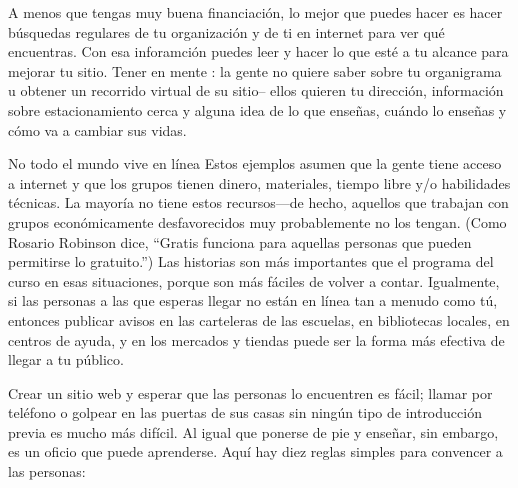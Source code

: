 A menos que tengas muy buena financiación,
lo mejor que puedes hacer es hacer búsquedas regulares de tu organización y de ti en internet 
para ver qué encuentras.
Con esa inforamción puedes leer 
y hacer lo que esté a tu alcance para mejorar tu sitio.
Tener en mente :
la gente no quiere saber sobre tu organigrama u obtener un recorrido virtual de su sitio-- ellos quieren tu dirección,
información sobre estacionamiento cerca 
y alguna idea de lo que enseñas,
cuándo lo enseñas
y cómo va a cambiar sus vidas.


\begin{aside}{No todo el mundo vive en línea}
Estos ejemplos asumen que la gente tiene acceso a internet y que los grupos 
tienen dinero, materiales, tiempo libre y/o habilidades técnicas.
La mayoría no tiene estos recursos---de hecho,
aquellos que trabajan con grupos económicamente desfavorecidos muy probablemente no los tengan.
(Como Rosario Robinson dice, ``Gratis funciona para aquellas personas que pueden permitirse lo gratuito.'')
Las historias son más importantes que el programa del curso en esas situaciones,
porque son más fáciles de volver a contar.
Igualmente,
si las personas a las que esperas llegar no están en línea tan a menudo como tú,
entonces publicar avisos en las carteleras de las escuelas,
en bibliotecas locales,
en centros de ayuda,
y en los mercados y tiendas puede ser la forma más efectiva de llegar a tu público.
\end{aside}



Crear un sitio web y esperar que las personas lo encuentren es fácil;
llamar por teléfono o golpear en las puertas de sus casas sin ningún tipo de introducción previa es mucho más difícil.
Al igual que ponerse de pie y enseñar,
sin embargo, es un oficio que puede aprenderse.
 Aquí hay diez reglas simples para convencer a las personas:

